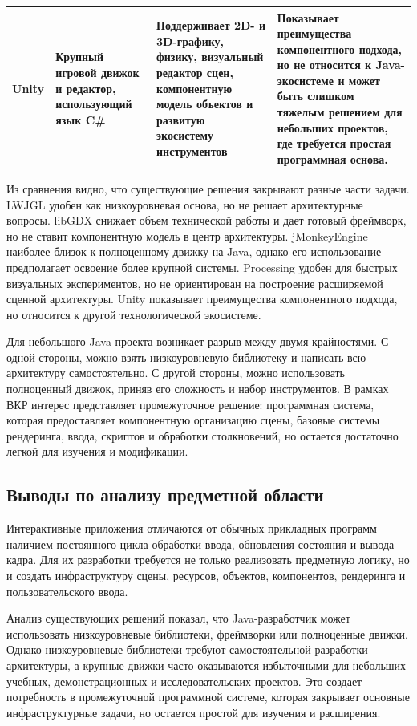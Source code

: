\begin{longtable}{|
>{\raggedright\arraybackslash}p{}|
>{\raggedright\arraybackslash}p{}|
>{\raggedright\arraybackslash}p{}|
>{\raggedright\arraybackslash}p{}|}
Unity &
Крупный игровой движок и редактор, использующий язык C\# &
Поддерживает 2D- и 3D-графику, физику, визуальный редактор сцен, компонентную модель объектов и развитую экосистему инструментов &
Показывает преимущества компонентного подхода, но не относится к Java-экосистеме и может быть слишком тяжелым решением для небольших проектов, где требуется простая программная основа. \\ \hline

\end{longtable}

\endgroup

Из сравнения видно, что существующие решения закрывают разные части
задачи. LWJGL удобен как низкоуровневая основа, но не решает архитектурные
вопросы. libGDX снижает объем технической работы и дает готовый фреймворк,
но не ставит компонентную модель в центр архитектуры. jMonkeyEngine
наиболее близок к полноценному движку на Java, однако его использование
предполагает освоение более крупной системы. Processing удобен для быстрых
визуальных экспериментов, но не ориентирован на построение расширяемой
сценной архитектуры. Unity показывает преимущества компонентного подхода,
но относится к другой технологической экосистеме.

Для небольшого Java-проекта возникает разрыв между двумя крайностями.
С одной стороны, можно взять низкоуровневую библиотеку и написать всю
архитектуру самостоятельно. С другой стороны, можно использовать
полноценный движок, приняв его сложность и набор инструментов. В рамках
ВКР интерес представляет промежуточное решение: программная система,
которая предоставляет компонентную организацию сцены, базовые системы
рендеринга, ввода, скриптов и обработки столкновений, но остается
достаточно легкой для изучения и модификации.

\subsection{Выводы по анализу предметной области}

Интерактивные приложения отличаются от обычных прикладных программ
наличием постоянного цикла обработки ввода, обновления состояния и вывода
кадра. Для их разработки требуется не только реализовать предметную логику,
но и создать инфраструктуру сцены, ресурсов, объектов, компонентов,
рендеринга и пользовательского ввода.

Анализ существующих решений показал, что Java-разработчик может
использовать низкоуровневые библиотеки, фреймворки или полноценные
движки. Однако низкоуровневые библиотеки требуют самостоятельной
разработки архитектуры, а крупные движки часто оказываются избыточными
для небольших учебных, демонстрационных и исследовательских проектов.
Это создает потребность в промежуточной программной системе, которая
закрывает основные инфраструктурные задачи, но остается простой для
изучения и расширения.

